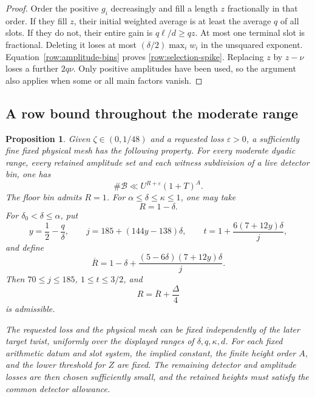 \documentclass[11pt,a4paper]{article}
\numberwithin{equation}{section}
\newtheorem{proposition}[theorem]{Proposition}
\theoremstyle{definition}
\theoremstyle{remark}
\newcommand{\eps}{\varepsilon}
\newcommand{\cB}{\mathcal B}
\begin{document}
\begin{proof}
Order the positive \(g_i\) decreasingly and fill a length \(z\)
fractionally in that order.  If they fill \(z\), their initial weighted
average is at least the average \(q\) of all slots.  If they do not,
their entire gain is \(q\ell/d\ge qz\).  At most one terminal slot is
fractional.  Deleting it loses at most
\((\delta/2)\max_iw_i\) in the unsquared exponent.
Equation~\eqref{row:amplitude-bins} proves
\eqref{row:selection-spike}.  Replacing \(z\) by \(z-\nu\) loses a
further \(2q\nu\).  Only positive amplitudes have been used, so the
argument also applies when some or all main factors vanish.
\end{proof}

\subsection{A row bound throughout the moderate range}
\label{row:counts}

\begin{proposition}\label{row:count-proposition}
Given \(\zeta\in(0,1/48)\) and a requested loss \(\eps>0\), a sufficiently
fine fixed physical mesh has the following property.  For every
moderate dyadic range, every retained amplitude set and each witness
subdivision of a live detector bin, one has
\begin{equation}\label{row:cardinality}
 \#\cB\ll U^{R+\eps}(1+T)^A.
\end{equation}
The floor bin admits \(R=1\).  For
\(\alpha\le\delta\le\kappa\le1\), one may take
\begin{equation}\label{row:high-delta}
 R=1-\delta.
\end{equation}
For \(\delta_0<\delta\le\alpha\), put
\begin{equation}\label{row:j-t}
 y=\frac12-\frac q\delta,\qquad
 j=185+(144y-138)\delta,\qquad
 t=1+\frac{6(7+12y)\delta}{j},
\end{equation}
and define
\begin{equation}\label{row:bar-R}
 \overline R=1-\delta+
       \frac{(5-6\delta)(7+12y)\delta}{j}.
\end{equation}
Then \(70\le j\le185\), \(1\le t\le3/2\), and
\begin{equation}\label{row:selected-R}
 R=\overline R+\frac{\Delta}{4}
\end{equation}
is admissible.

The requested loss and the physical mesh can be fixed independently of
the later target twist, uniformly over the displayed ranges of
\(\delta,q,\kappa,d\).  For each fixed arithmetic datum and slot
system, the implied constant, the finite height order \(A\), and the
lower threshold for \(Z\) are fixed.  The remaining detector and
amplitude losses are then chosen sufficiently small, and the retained
heights must satisfy the common detector allowance.
\end{proposition}
\end{document}
